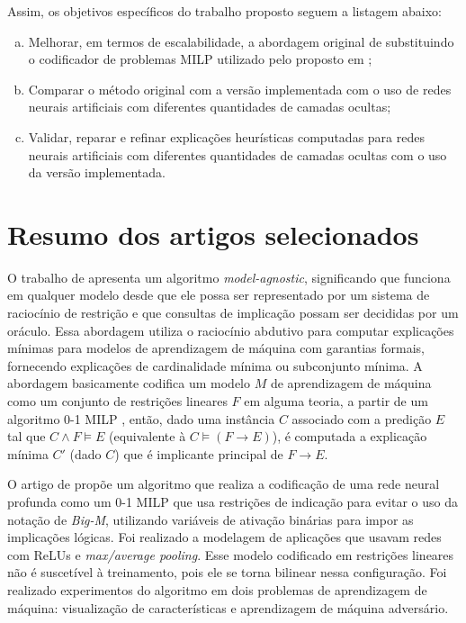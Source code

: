 Assim, os objetivos específicos do trabalho proposto seguem a listagem abaixo:
\begin{enumerate}[a)]
    \item Melhorar, em termos de escalabilidade, a abordagem original de  substituindo o codificador de problemas MILP utilizado pelo proposto em ;
    \item Comparar o método original com a versão implementada com o uso de redes neurais artificiais com diferentes quantidades de camadas ocultas;
    \item Validar, reparar e refinar explicações heurísticas computadas para redes neurais artificiais com diferentes quantidades de camadas ocultas com o uso da versão implementada.
\end{enumerate}

\section{Resumo dos artigos selecionados}

O trabalho de  apresenta um algoritmo \textit{model-agnostic}, significando que funciona em qualquer modelo desde que ele possa ser representado por um sistema de raciocínio de restrição e que consultas de implicação possam ser decididas por um oráculo. Essa abordagem utiliza o raciocínio abdutivo para computar explicações mínimas para modelos de aprendizagem de máquina com garantias formais, fornecendo explicações de cardinalidade mínima ou subconjunto mínima. A abordagem basicamente codifica um modelo $M$ de aprendizagem de máquina como um conjunto de restrições lineares $F$ em alguma teoria, a partir de um algoritmo 0-1 MILP \cite{milp_01}, então, dado uma instância $C$ associado com a predição $E$ tal que $C \wedge F \models E$ (equivalente à $C \models (F \rightarrow E)$), é computada a explicação mínima $C'$ (dado $C$) que é implicante principal de  $F \rightarrow E$. 

O artigo de  propõe um algoritmo que realiza a codificação de uma rede neural profunda como um 0-1 MILP que usa restrições de indicação para evitar o uso da notação de \textit{Big-M}, utilizando variáveis de ativação binárias para impor as implicações lógicas. Foi realizado a modelagem de aplicações que usavam redes com ReLUs e \textit{max/average pooling}. Esse modelo codificado em restrições lineares não é suscetível à treinamento, pois ele se torna bilinear nessa configuração. Foi realizado experimentos do algoritmo em dois problemas de aprendizagem de máquina: visualização de características e aprendizagem de máquina adversário.


